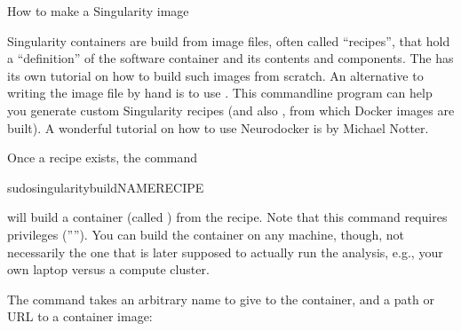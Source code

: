 \ignorespaces \begin{findoutmore}[label={fom-container-creation}, before title={\thetcbcounter\ }, check odd page=true]{How to make a Singularity image}
\label{\detokenize{basics/101-133-containersrun:fom-container-creation}}

\sphinxAtStartPar
Singularity containers are build from image files, often
called “recipes”, that hold a “definition” of the software container and its
contents and components. The
has its own tutorial on how to build such images from scratch.
An alternative to writing the image file by hand is to use
. This
command\sphinxhyphen{}line program can help you generate custom Singularity recipes (and
also , from which Docker images are built). A wonderful tutorial
on how to use Neurodocker is
by Michael Notter.

\sphinxAtStartPar
Once a recipe exists, the command

\begin{sphinxVerbatim}[commandchars=\\\{\}]
sudosingularitybuild\PYGZlt{}NAME\PYGZgt{}\PYGZlt{}RECIPE\PYGZgt{}
\end{sphinxVerbatim}

\sphinxAtStartPar
will build a container (called ) from the recipe. Note that this
command requires  privileges (””). You can build the container
on any machine, though, not necessarily the one that is later supposed to
actually run the analysis, e.g., your own laptop versus a compute cluster.


\end{findoutmore}

\ignorespaces 
\sphinxAtStartPar
The  command takes an arbitrary
name to give to the container, and a path or URL to a container image:

